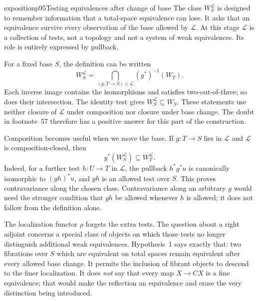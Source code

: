 \begin{dcomment}{exposition}{p95}{Testing equivalences after change of base}
The class $W_S^{\mathcal L}$ is designed to remember information that a total-space equivalence can lose. It asks that an equivalence survive every observation of the base allowed by $\mathcal L$. At this stage $\mathcal L$ is a collection of tests, not a topology and not a system of weak equivalences. Its role is entirely expressed by pullback.

For a fixed base $S$, the definition can be written
\[
 W_S^{\mathcal L}
 =\bigcap_{(g:T\to S)\in\mathcal L}(g^*)^{-1}(W_T).
\]
Each inverse image contains the isomorphisms and satisfies two-out-of-three; so does their intersection. The identity test gives $W_S^{\mathcal L}\subseteq W_S$. These statements use neither closure of $\mathcal L$ under composition nor closure under base change. The doubt in footnote~57 therefore has a positive answer for this part of the construction.

Composition becomes useful when we move the base. If $g:T\to S$ lies in $\mathcal L$ and $\mathcal L$ is composition-closed, then
\[
 g^*(W_S^{\mathcal L})\subseteq W_T^{\mathcal L}.
\]
Indeed, for a further test $h:U\to T$ in $\mathcal L$, the pullback $h^*g^*u$ is canonically isomorphic to $(gh)^*u$, and $gh$ is an allowed test over $S$. This proves contravariance along the chosen class. Contravariance along an arbitrary $g$ would need the stronger condition that $gh$ be allowed whenever $h$ is allowed; it does not follow from the definition alone.

The localization functor $\rho$ forgets the extra tests. The question about a right adjoint concerns a special class of objects on which those tests no longer distinguish additional weak equivalences. Hypothesis~1 says exactly that: two fibrations over $S$ which are equivalent on total spaces remain equivalent after every allowed base change. It permits the inclusion of fibrant objects to descend to the finer localization. It does \emph{not} say that every map $X\to CX$ is a fine equivalence; that would make the reflection an equivalence and erase the very distinction being introduced.


\end{dcomment}
